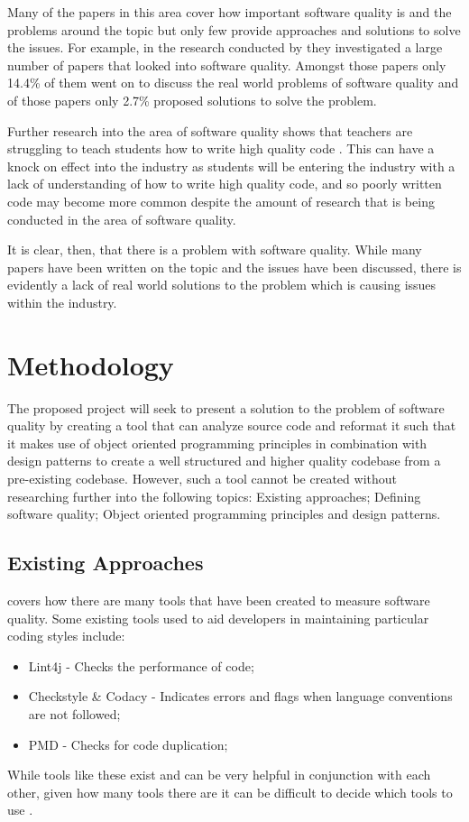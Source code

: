 \documentclass{article} %
\begin{document}
Many of the papers in this area cover how important software quality is and the problems around the topic but only few provide approaches and solutions to solve the issues. For example, in the research conducted by \cite{6606742} they investigated a large number of papers that looked into software quality. Amongst those papers only 14.4\% of them went on to discuss the real world problems of software quality and of those papers only 2.7\% proposed solutions to solve the problem.

Further research into the area of software quality shows that teachers are struggling to teach students how to write high quality code \citep{10.1145/3428029.3428047}. This can have a knock on effect into the industry as students will be entering the industry with a lack of understanding of how to write high quality code, and so poorly written code may become more common despite the amount of research that is being conducted in the area of software quality.

It is clear, then, that there is a problem with software quality. While many papers have been written on the topic and the issues have been discussed, there is evidently a lack of real world solutions to the problem which is causing issues within the industry.

\section{Methodology}

The proposed project will seek to present a solution to the problem of software quality by creating a tool that can analyze source code and reformat it such that it makes use of object oriented programming principles in combination with design patterns to create a well structured and higher quality codebase from a pre-existing codebase.
However, such a tool cannot be created without researching further into the following topics: Existing approaches; Defining software quality; Object oriented programming principles and design patterns.

\subsection{Existing Approaches}
\cite{8681007} covers how there are many tools that have been created to measure software quality. Some existing tools used to aid developers in maintaining particular coding styles include:
\begin{itemize}
	\item Lint4j - Checks the performance of code;
	\item Checkstyle \& Codacy - Indicates errors and flags when language conventions are not followed;
	\item PMD - Checks for code duplication;
\end{itemize}
While tools like these exist and can be very helpful in conjunction with each other, given how many tools there are it can be difficult to decide which tools to use \citep{6606742}.
\end{document}

